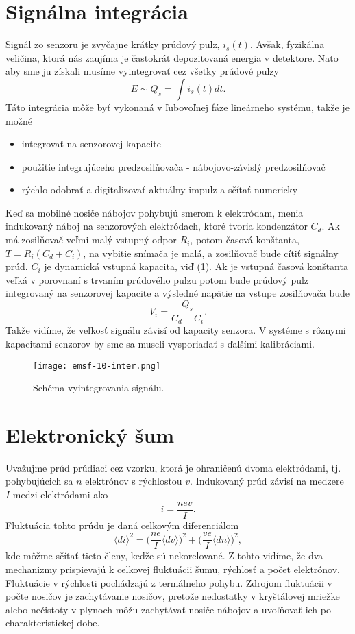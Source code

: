 \documentclass[../../main.tex]{subfiles}
\begin{document}
\section{Signálna integrácia}
Signál zo senzoru je zvyčajne krátky prúdový pulz, $i_s(t)$. Avšak, fyzikálna veličina, ktorá nás zaujíma je častokrát depozitovaná energia v detektore. Nato aby sme ju získali musíme vyintegrovať cez všetky prúdové pulzy
$$ E \sim Q_s = \int i_s(t)dt.$$
Táto integrácia môže byť vykonaná v ľubovoľnej fáze lineárneho systému, takže je možné
\begin{itemize}
\item integrovať na senzorovej kapacite
\item použitie integrujúceho predzosilňovača - nábojovo-závislý predzosilňovač
\item rýchlo odobrať a digitalizovať aktuálny impulz a sčítať numericky
\end{itemize}

Keď sa mobilné nosiče nábojov pohybujú smerom k elektródam, menia indukovaný náboj na senzorových elektródach, ktoré tvoria kondenzátor $C_d$. Ak má zosilňovač veľmi malý vstupný odpor $R_i$, potom časová konštanta, $T = R_i(C_d+C_i)$, na vybitie snímača je malá, a zosilňovač bude cítiť signálny prúd. $C_i$ je dynamická vstupná kapacita, viď (\ref{em10:fig:inter}). Ak je vstupná časová konštanta veľká v porovnaní s trvaním prúdového pulzu potom bude prúdový pulz integrovaný na senzorovej kapacite a výsledné napätie na vstupe zosilňovača bude
$$ V_i = \frac{Q_s}{C_d + C_i}. $$ 
Takže vidíme, že veľkosť signálu závisí od kapacity senzora. V systéme s rôznymi kapacitami senzorov by sme sa museli vysporiadať s ďalšími kalibráciami. 

\begin{figure}[!h]
\texttt{[image: emsf-10-inter.png]}
\centering
\caption{Schéma vyintegrovania signálu.}
\label{em10:fig:inter}
\end{figure}

\section{Elektronický šum}
Uvažujme prúd prúdiaci cez vzorku, ktorá je ohraničenú dvoma elektródami, tj. pohybujúcich sa $n$ elektrónov s rýchlosťou $v$. Indukovaný prúd závisí na medzere $I$ medzi elektródami ako 
$$ i = \frac{nev}{I}.$$
Fluktuácia tohto prúdu je daná celkovým diferenciálom
$$ \langle di \rangle^2 = \bigg( \frac{ne}{I} \langle dv \rangle  \bigg)^2 + \bigg( \frac{ve}{I} \langle dn \rangle  \bigg)^2,$$
kde môžme sčítať tieto členy, keďže sú nekorelované. Z tohto vidíme, že dva mechanizmy prispievajú k celkovej fluktuácii šumu, rýchlosť a počet elektrónov. Fluktuácie v rýchlosti pochádzajú z termálneho pohybu. Zdrojom fluktuácii v počte nosičov je zachytávanie nosičov, pretože nedostatky v kryštálovej mriežke alebo nečistoty v plynoch môžu zachytávať nosiče nábojov a uvoľňovať ich po charakteristickej dobe.
\end{document}
